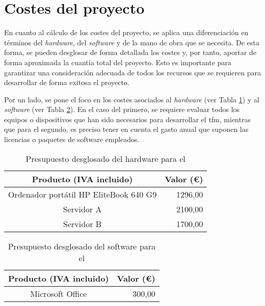 \section{Costes del proyecto}

En cuanto al cálculo de los costes del proyecto, se aplica una diferenciación en términos del \textit{hardware}, del \textit{software} y de la mano de obra que se necesita. De esta forma, se pueden desglosar de forma detallada los costes y, por tanto, aportar de forma aproximada la cuantía total del proyecto. Esto es importante para garantizar una consideración adecuada de todos los recursos que se requieren para desarrollar de forma exitosa el proyecto.

\vspace{3mm}

Por un lado, se pone el foco en los costes asociados al \textit{hardware} (ver Tabla \ref{tab:costesHardware}) y al \textit{software} (ver Tabla \ref{tab:costesSoftware}). En el caso del primero, se requiere evaluar todos los equipos o dispositivos que han sido necesarios para desarrollar el \gls{tfm}, mientras que para el segundo, es preciso tener en cuenta el gasto anual que suponen las licencias o paquetes de software empleados. 

\vspace{3mm}

\begin{table}[ht]
	\centering
	\begin{tabular}{|c|r|}
		\hline
		\rowcolor[HTML]{EFEFEF}
		Producto (IVA incluido) & \multicolumn{1}{c|}{\cellcolor[HTML]{EFEFEF}Valor (€)} \\ \hline
		Ordenador portátil HP EliteBook 640 G9 & 1296,00  \\ \hline
		Servidor A & 2100,00 \\ \hline
		Servidor B & 1700,00 \\ \hline
	\end{tabular}
	\caption{Presupuesto desglosado del hardware para el }
	\label{tab:costesHardware}
\end{table}

\vspace{1mm}

\begin{table}[ht]
	\centering
	\begin{tabular}{|c|r|}
		\hline
		\rowcolor[HTML]{EFEFEF}
		Producto (IVA incluido) & \multicolumn{1}{c|}{\cellcolor[HTML]{EFEFEF}Valor (€)} \\ \hline
		Microsoft Office & 300,00 \\ \hline
	\end{tabular}
	\caption{Presupuesto desglosado del software para el }
	\label{tab:costesSoftware}
\end{table}

